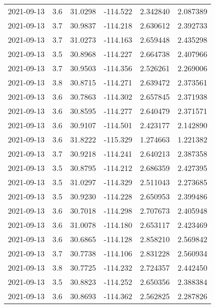 \begin{tabular}{lrrrrr}
2021-09-13 &       3.6 &  31.0298 &  -114.522 &         2.342840 &         2.087389 \\
2021-09-13 &       3.7 &  30.9837 &  -114.218 &         2.630612 &         2.392733 \\
2021-09-13 &       3.7 &  31.0273 &  -114.163 &         2.659448 &         2.435298 \\
2021-09-13 &       3.5 &  30.8968 &  -114.227 &         2.664738 &         2.407966 \\
2021-09-13 &       3.7 &  30.9503 &  -114.356 &         2.526261 &         2.269006 \\
2021-09-13 &       3.8 &  30.8715 &  -114.271 &         2.639472 &         2.373561 \\
2021-09-13 &       3.6 &  30.7863 &  -114.302 &         2.657845 &         2.371938 \\
2021-09-13 &       3.6 &  30.8595 &  -114.277 &         2.640479 &         2.371571 \\
2021-09-13 &       3.6 &  30.9107 &  -114.501 &         2.423177 &         2.142890 \\
2021-09-13 &       3.6 &  31.8222 &  -115.329 &         1.274663 &         1.221382 \\
2021-09-13 &       3.7 &  30.9218 &  -114.241 &         2.640213 &         2.387358 \\
2021-09-13 &       3.5 &  30.8795 &  -114.212 &         2.686359 &         2.427395 \\
2021-09-13 &       3.5 &  31.0297 &  -114.329 &         2.511043 &         2.273685 \\
2021-09-13 &       3.5 &  30.9230 &  -114.228 &         2.650953 &         2.399486 \\
2021-09-13 &       3.6 &  30.7018 &  -114.298 &         2.707673 &         2.405948 \\
2021-09-13 &       3.6 &  31.0078 &  -114.180 &         2.653117 &         2.423469 \\
2021-09-13 &       3.6 &  30.6865 &  -114.128 &         2.858210 &         2.569842 \\
2021-09-13 &       3.7 &  30.7738 &  -114.106 &         2.831228 &         2.560934 \\
2021-09-13 &       3.8 &  30.7725 &  -114.232 &         2.724357 &         2.442450 \\
2021-09-13 &       3.5 &  30.8823 &  -114.252 &         2.650356 &         2.388384 \\
2021-09-13 &       3.6 &  30.8693 &  -114.362 &         2.562825 &         2.287826 \\

\end{tabular}
